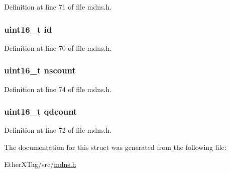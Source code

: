 Definition at line 71 of file mdns.\-h.

\hypertarget{structdns__packet__header__t_a4fc3a0c58dfbd1e68224521185cb9384}{
\subsubsection[{id}]{\setlength{\rightskip}{0pt plus 5cm}uint16\-\_\-t id}}\label{structdns__packet__header__t_a4fc3a0c58dfbd1e68224521185cb9384}


Definition at line 70 of file mdns.\-h.

\hypertarget{structdns__packet__header__t_aa613b2dc181144b8d4c975a5260d59e3}{
\subsubsection[{nscount}]{\setlength{\rightskip}{0pt plus 5cm}uint16\-\_\-t nscount}}\label{structdns__packet__header__t_aa613b2dc181144b8d4c975a5260d59e3}


Definition at line 74 of file mdns.\-h.

\hypertarget{structdns__packet__header__t_a04016da27d1b8b5859d8527d2742f4f4}{
\subsubsection[{qdcount}]{\setlength{\rightskip}{0pt plus 5cm}uint16\-\_\-t qdcount}}\label{structdns__packet__header__t_a04016da27d1b8b5859d8527d2742f4f4}


Definition at line 72 of file mdns.\-h.



The documentation for this struct was generated from the following file\-:\begin{DoxyCompactItemize}
\item 
Ether\-X\-Tag/src/\hyperlink{mdns_8h}{mdns.\-h}\end{DoxyCompactItemize}
